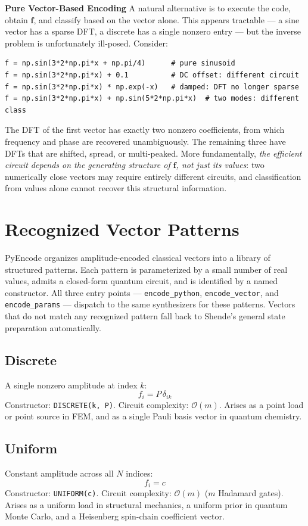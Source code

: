 \documentclass[10pt,twocolumn]{article}
\begin{document}
\textbf{Pure Vector-Based Encoding}
A natural alternative is to execute the code, obtain $\mathbf{f}$, and classify based on the vector alone. This appears tractable --- a sine vector has a sparse DFT, a discrete has a single nonzero entry --- but the inverse problem is unfortunately ill-posed. Consider:
\begin{lstlisting}[style=python]
f = np.sin(3*2*np.pi*x + np.pi/4)      # pure sinusoid
f = np.sin(3*2*np.pi*x) + 0.1          # DC offset: different circuit
f = np.sin(3*2*np.pi*x) * np.exp(-x)   # damped: DFT no longer sparse
f = np.sin(3*2*np.pi*x) + np.sin(5*2*np.pi*x)  # two modes: different class
\end{lstlisting}
The DFT of the first vector has exactly two nonzero coefficients, from which frequency and phase are recovered unambiguously. The remaining three have DFTs that are shifted, spread, or multi-peaked. More fundamentally, \emph{the efficient circuit depends on the generating structure of $\mathbf{f}$, not just its values}: two numerically close vectors may require entirely different circuits, and classification from values alone cannot recover this structural information.

\section{Recognized Vector Patterns}
\label{sec:patterns}

PyEncode organizes amplitude-encoded classical vectors into a
library of structured patterns. Each pattern is parameterized
by a small number of real values, admits a closed-form quantum
circuit, and is identified by a named constructor. All three
entry points --- \texttt{encode\_python}, \texttt{encode\_vector},
and \texttt{encode\_params} --- dispatch to the same synthesizers
for these patterns. Vectors that do not match any recognized
pattern fall back to Shende's general state preparation
automatically.

\subsection*{Discrete}
A single nonzero amplitude at index $k$:
\[
  f_i = P\,\delta_{ik}
\]
Constructor: \texttt{DISCRETE(k, P)}.
Circuit complexity: $\mathcal{O}(m)$.
Arises as a point load or point source in FEM, and as a
single Pauli basis vector in quantum chemistry.

\subsection*{Uniform}
Constant amplitude across all $N$ indices:
\[
  f_i = c
\]
Constructor: \texttt{UNIFORM(c)}.
Circuit complexity: $\mathcal{O}(m)$ ($m$ Hadamard gates).
Arises as a uniform load in structural mechanics, a uniform
prior in quantum Monte Carlo, and a Heisenberg spin-chain
coefficient vector.
\end{document}
